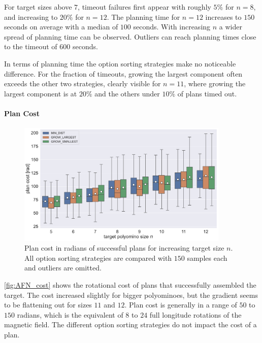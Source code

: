 For target sizes above $7$, timeout failures first appear with roughly $5\%$ for $n = 8$, and increasing to $20\%$ for $n=12$.
The planning time for $n = 12$ increases to $150$ seconds on average with a median of $100$ seconds.
With increasing $n$ a wider spread of planning time can be observed.
Outliers can reach planning times close to the timeout of $600$ seconds.

In terms of planning time the option sorting strategies make no noticeable difference.
For the fraction of timeouts, growing the largest component often exceeds the other two strategies, clearly visible for $n=11$, where growing the largest component is at $20\%$ and the others under $10\%$ of plans timed out.


\paragraph{Plan Cost}

\begin{figure}
	\centering
	\includegraphics[width=0.9\textwidth]{figures/plots/AFN_cost.pdf}
	\caption[Plan cost for increasing target size]{Plan cost in radians of successful plans for increasing target size $n$. All option sorting strategies are compared with $150$ samples each and outliers are omitted.}
	\label{fig:AFN_cost}
\end{figure}

\autoref{fig:AFN_cost} shows the rotational cost of plans that successfully assembled the target.
The cost increased slightly for bigger polyominoes, but the gradient seems to be flattening out for sizes $11$ and $12$.
Plan cost is generally in a range of $50$ to $150$ radians, which is the equivalent of $8$ to $24$ full longitude rotations of the magnetic field.
The different option sorting strategies do not impact the cost of a plan.


